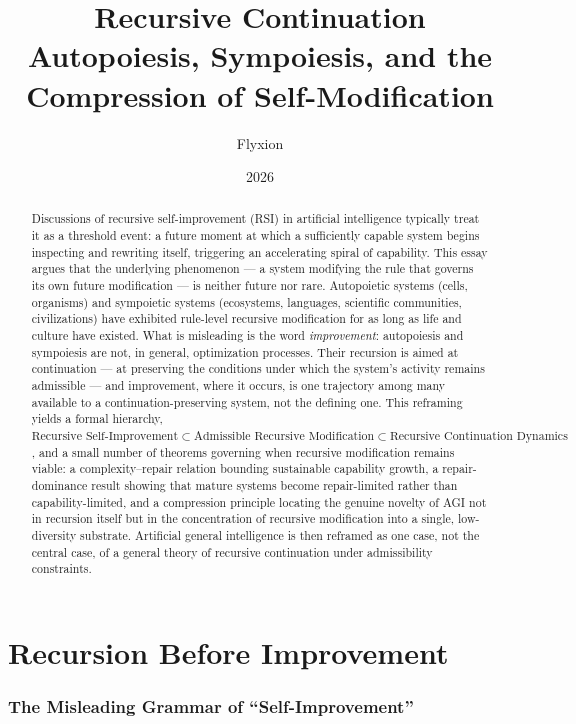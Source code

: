 \documentclass[11pt,a4paper]{article}
\title{\textbf{Recursive Continuation}\\
\large Autopoiesis, Sympoiesis, and the Compression of Self-Modification}
\author{Flyxion}
\date{2026}
\theoremstyle{plain}
\theoremstyle{definition}
\theoremstyle{remark}
\begin{document}
\maketitle

\begin{abstract}
Discussions of recursive self-improvement (RSI) in artificial intelligence typically treat it as a threshold event: a future moment at which a sufficiently capable system begins inspecting and rewriting itself, triggering an accelerating spiral of capability. This essay argues that the underlying phenomenon — a system modifying the rule that governs its own future modification — is neither future nor rare. Autopoietic systems (cells, organisms) and sympoietic systems (ecosystems, languages, scientific communities, civilizations) have exhibited rule-level recursive modification for as long as life and culture have existed. What is misleading is the word \emph{improvement}: autopoiesis and sympoiesis are not, in general, optimization processes. Their recursion is aimed at continuation — at preserving the conditions under which the system's activity remains admissible — and improvement, where it occurs, is one trajectory among many available to a continuation-preserving system, not the defining one. This reframing yields a formal hierarchy, $\text{Recursive Self-Improvement} \subset \text{Admissible Recursive Modification} \subset \text{Recursive Continuation Dynamics}$, and a small number of theorems governing when recursive modification remains viable: a complexity–repair relation bounding sustainable capability growth, a repair-dominance result showing that mature systems become repair-limited rather than capability-limited, and a compression principle locating the genuine novelty of AGI not in recursion itself but in the concentration of recursive modification into a single, low-diversity substrate. Artificial general intelligence is then reframed as one case, not the central case, of a general theory of recursive continuation under admissibility constraints.
\end{abstract}
\newpage

\tableofcontents
\newpage

\part{Recursion Before Improvement}

\section{The Misleading Grammar of ``Self-Improvement''}
\label{sec:myth-of-novelty}
\end{document}
